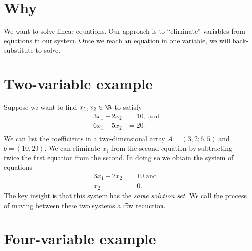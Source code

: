 

\section*{Why}

We want to solve linear equations.
Our approach is to ``eliminate'' variables from equations in our system.
Once we reach an equation in one variable, we will back-substitute to solve.

\section*{Two-variable example}

Suppose we want to find $x_1, x_2 \in \R $ to satisfy
\[
\begin{aligned}
3x_1 + 2x_2 &= 10, \text{ and} \\
6x_1 + 5x_2 &= 20. \\
\end{aligned}
\]
We can list the coefficients in a two-dimensional array $A = (3, 2; 6, 5)$ and $b = (10,20)$.
We can eliminate $x_1$ from the second equation by subtracting twice the first equation from the second.
In doing so we obtain the system of equations
\[
\begin{aligned}
3x_1 + 2x_2 &= 10 \text{ and } \\
x_2 &= 0.
\end{aligned}
\]
The key insight is that this system has the \textit{same solution set}.
We call the process of moving between these two systems a \t{row reduction}.

\section*{Four-variable example}

